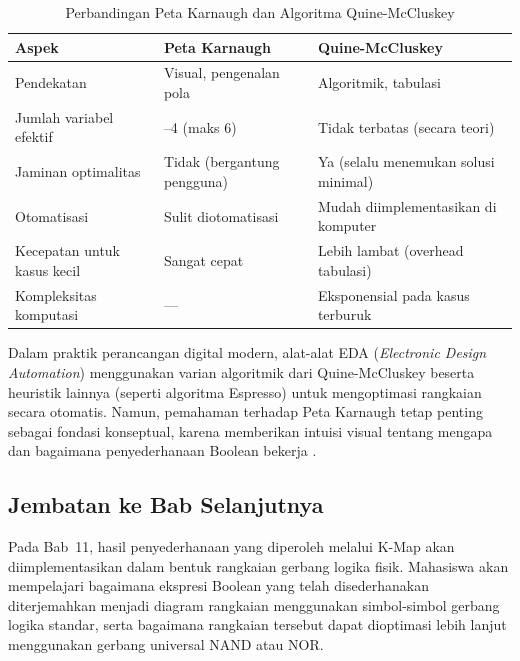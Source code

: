 \begin{table}[htbp]
\centering
\renewcommand{\arraystretch}{1.3}
\begin{tabular}{|>{\raggedright\arraybackslash}p{4.5cm}|>{\raggedright\arraybackslash}p{4.5cm}|>{\raggedright\arraybackslash}p{4.5cm}|}
\hline
\textbf{Aspek} & \textbf{Peta Karnaugh} & \textbf{Quine-McCluskey} \\ \hline
Pendekatan & Visual, pengenalan pola & Algoritmik, tabulasi \\ \hline
Jumlah variabel efektif & 2--4 (maks 6) & Tidak terbatas (secara teori) \\ \hline
Jaminan optimalitas & Tidak (bergantung pengguna) & Ya (selalu menemukan solusi minimal) \\ \hline
Otomatisasi & Sulit diotomatisasi & Mudah diimplementasikan di komputer \\ \hline
Kecepatan untuk kasus kecil & Sangat cepat & Lebih lambat (overhead tabulasi) \\ \hline
Kompleksitas komputasi & --- & Eksponensial pada kasus terburuk \\ \hline
\end{tabular}
\caption{Perbandingan Peta Karnaugh dan Algoritma Quine-McCluskey}
\label{tab:kmap-vs-qm}
\end{table}

Dalam praktik perancangan digital modern, alat-alat EDA (\textit{Electronic Design Automation}) menggunakan varian algoritmik dari Quine-McCluskey beserta heuristik lainnya (seperti algoritma Espresso) untuk mengoptimasi rangkaian secara otomatis. Namun, pemahaman terhadap Peta Karnaugh tetap penting sebagai fondasi konseptual, karena memberikan intuisi visual tentang mengapa dan bagaimana penyederhanaan Boolean bekerja \cite{wiki_quine_mccluskey}.

\subsection{Jembatan ke Bab Selanjutnya}

Pada Bab~11, hasil penyederhanaan yang diperoleh melalui K-Map akan diimplementasikan dalam bentuk rangkaian gerbang logika fisik. Mahasiswa akan mempelajari bagaimana ekspresi Boolean yang telah disederhanakan diterjemahkan menjadi diagram rangkaian menggunakan simbol-simbol gerbang logika standar, serta bagaimana rangkaian tersebut dapat dioptimasi lebih lanjut menggunakan gerbang universal NAND atau NOR.
